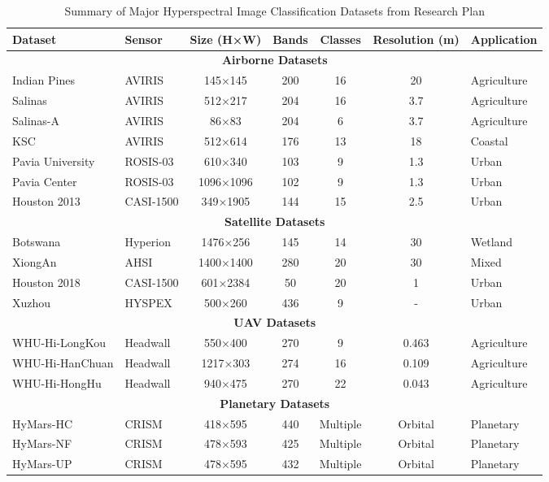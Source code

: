 \documentclass[journal]{IEEEtran}
\begin{document}
\begin{table*}[htbp]
\centering
\caption{Summary of Major Hyperspectral Image Classification Datasets from Research Plan}
\label{tab:dataset_summary}
\begin{tabular}{|l|l|c|c|c|c|l|}
\hline
\textbf{Dataset} & \textbf{Sensor} & \textbf{Size (H×W)} & \textbf{Bands} & \textbf{Classes} & \textbf{Resolution (m)} & \textbf{Application} \\
\hline
\multicolumn{7}{|c|}{\textbf{Airborne Datasets}} \\
\hline
Indian Pines & AVIRIS & 145×145 & 200 & 16 & 20 & Agriculture \\
Salinas & AVIRIS & 512×217 & 204 & 16 & 3.7 & Agriculture \\
Salinas-A & AVIRIS & 86×83 & 204 & 6 & 3.7 & Agriculture \\
KSC & AVIRIS & 512×614 & 176 & 13 & 18 & Coastal \\
Pavia University & ROSIS-03 & 610×340 & 103 & 9 & 1.3 & Urban \\
Pavia Center & ROSIS-03 & 1096×1096 & 102 & 9 & 1.3 & Urban \\
Houston 2013 & CASI-1500 & 349×1905 & 144 & 15 & 2.5 & Urban \\
\hline
\multicolumn{7}{|c|}{\textbf{Satellite Datasets}} \\
\hline
Botswana & Hyperion & 1476×256 & 145 & 14 & 30 & Wetland \\
XiongAn & AHSI & 1400×1400 & 280 & 20 & 30 & Mixed \\
Houston 2018 & CASI-1500 & 601×2384 & 50 & 20 & 1 & Urban \\
Xuzhou & HYSPEX & 500×260 & 436 & 9 & - & Urban \\
\hline
\multicolumn{7}{|c|}{\textbf{UAV Datasets}} \\
\hline
WHU-Hi-LongKou & Headwall & 550×400 & 270 & 9 & 0.463 & Agriculture \\
WHU-Hi-HanChuan & Headwall & 1217×303 & 274 & 16 & 0.109 & Agriculture \\
WHU-Hi-HongHu & Headwall & 940×475 & 270 & 22 & 0.043 & Agriculture \\
\hline
\multicolumn{7}{|c|}{\textbf{Planetary Datasets}} \\
\hline
HyMars-HC & CRISM & 418×595 & 440 & Multiple & Orbital & Planetary \\
HyMars-NF & CRISM & 478×593 & 425 & Multiple & Orbital & Planetary \\
HyMars-UP & CRISM & 478×595 & 432 & Multiple & Orbital & Planetary \\
\hline
\end{tabular}
\end{table*}
\end{document}
